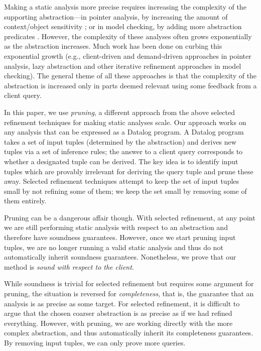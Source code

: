 
Making a static analysis more precise requires increasing the complexity of the
supporting abstraction---in pointer analysis, by increasing the amount of
context/object sensitivity \cite{kcfa, kobj, MilanovaRountevRyder2005,
WhaleyLam2004, LhotakHendren2006, LhotakHendren2008}; or in model checking, by
adding more abstraction predicates \cite{graf97predicate,slam}.
However, the complexity of these analyses often grows exponentially as the
abstraction increases.
Much work has been done on curbing this exponential growth
(e.g., client-driven \cite{GuyerLin2003} and demand-driven
\cite{HeintzeTardieu2001} approaches in pointer analysis,
lazy abstraction \cite{henzinger02lazy,mcmillan06lazy} and other iterative refinement approaches in model checking).
The general theme of all these approaches is that the
complexity of the abstraction is increased only in parts deemed relevant using
some feedback from a client query.

In this paper, we use {\em pruning}, a different approach from
the above selected refinement techniques for making static analyses scale.
Our approach works on any analysis that can be expressed as a Datalog program.
A Datalog program takes a set of input tuples (determined by the abstraction)
and derives new tuples via a set of inference rules; the answer to a client
query corresponds to whether a designated tuple can be derived.  The key idea
is to identify input tuples which are provably irrelevant for deriving the
query tuple and prune these away.  Selected refinement techniques
attempt to keep the set of input tuples small by not refining some of them; we
keep the set small by removing some of them entirely.

Pruning can be a dangerous affair though.  With selected refinement, at any
point we are still performing static analysis with respect to an abstraction
and therefore have soundness guarantees.  However, once we start pruning input
tuples, we are no longer running a valid static analysis and thus do not
automatically inherit soundness guarantees.  Nonetheless, we prove that our
method is {\em sound with respect to the client}.

While soundness is trivial for selected refinement but requires some argument for pruning,
the situation is reversed for {\em completeness}, that is, the guarantee that
an analysis is as precise as some target.  For selected refinement,
it is difficult to argue that the chosen coarser abstraction is as precise as if we
had refined everything.  However, with pruning, we are working directly with
the more complex abstraction, and thus automatically inherit its completeness
guarantees.  By removing input tuples, we can only prove more queries.

